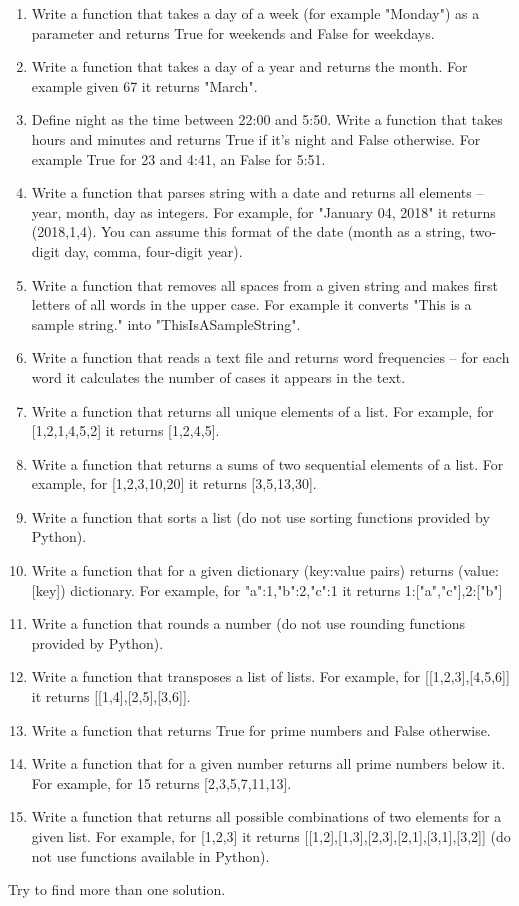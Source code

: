 \begin{enumerate}
\item Write a function that takes a day of a week (for example "Monday")
as a parameter and returns True for weekends and False for weekdays.
\item Write a function that takes a day of a year and returns 
the month. For example given 67 it returns "March".
\item Define night as the time between 22:00 and 5:50. 
Write a function that takes hours and minutes and returns True if
it's night and False otherwise. For example True for 23 and 4:41, 
an False for 5:51.
\item Write a function that parses string with a date and returns
all elements -- year, month, day as integers. For example, for
"January 04, 2018" it returns (2018,1,4). You can assume this format of
the date (month as a string, two-digit day, comma, four-digit year).
\item Write a function that removes all spaces from a given string
and makes first letters of all words in the upper case. For example
it converts "This is a sample string." into "ThisIsASampleString".
\item Write a function that reads a text file and returns word frequencies 
-- for each word it calculates the number of cases it appears in the
text.
\item Write a function that returns all unique elements of a list. 
For example, for [1,2,1,4,5,2] it returns [1,2,4,5].
\item Write a function that returns a sums of two sequential elements of
a list. For example, for [1,2,3,10,20] it returns [3,5,13,30]. 
\item Write a function that sorts a list (do not use sorting functions 
provided by Python). 
\item Write a function that for a given dictionary (key:value pairs)
returns (value:[key]) dictionary. For example, for {"a":1,"b":2,"c":1}
it returns {1:["a","c"],2:["b"]}
\item Write a function that rounds a number (do not use rounding functions
provided by Python).
\item Write a function that transposes a list of lists. For example,
for [[1,2,3],[4,5,6]] it returns [[1,4],[2,5],[3,6]].
\item Write a function that returns True for prime numbers and
False otherwise.
\item Write a function that for a given number 
returns all prime numbers below it. For example, for 15 returns
[2,3,5,7,11,13].
\item Write a function that returns all possible combinations
of two elements for a given list. For example, for [1,2,3] it
returns [[1,2],[1,3],[2,3],[2,1],[3,1],[3,2]] (do not use
functions available in Python).
\end{enumerate}

Try to find more than one solution. 








